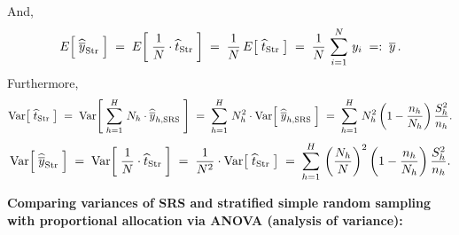 \documentclass{article}
\begin{document}
And,
\begin{equation*}
           E\!\left[\;\widehat{\overline{y}}_{\textnormal{Str}}\;\right]
   \;=\;  E\!\left[\;\dfrac{1}{N}\cdot\widehat{t}_{\textnormal{Str}}\;\right]
   \;=\;  \dfrac{1}{N}\,E\!\left[\;\widehat{t}_{\textnormal{Str}}\;\right]
   \;=\;  \dfrac{1}{N}\,\sum^{N}_{i=1}\,y_{i}
   \;=:\; \overline{y}\,.
\end{equation*}
Furthermore,
\begin{equation*}
             \textnormal{Var}\!\left[\;\widehat{t}_{\textnormal{Str}}\;\right]
    \;=\;  \textnormal{Var}\!\left[\; \sum^{H}_{h=1}\, N_{h}\cdot\widehat{\overline{y}}_{h,\textnormal{SRS}} \;\right]
    \;=\;  \sum^{H}_{h=1}\, N_{h}^{2}\cdot\textnormal{Var}\!\left[\; \widehat{\overline{y}}_{h,\textnormal{SRS}} \;\right]
    \;=\;  \sum^{H}_{h=1}\, N_{h}^{2}\left(1-\dfrac{n_{h}}{N_{h}}\right)\dfrac{S^{2}_{h}}{n_{h}}.
\end{equation*}
\begin{equation*}
             \textnormal{Var}\!\left[\;\widehat{\overline{y}}_{\textnormal{Str}}\;\right]
    \;=\;  \textnormal{Var}\!\left[\; \dfrac{1}{N}\cdot\widehat{t}_{\textnormal{Str}} \;\right]
    \;=\;  \dfrac{1}{N^{2}}\cdot\textnormal{Var}\!\left[\; \widehat{t}_{\textnormal{Str}} \;\right]
    \;=\;  \sum^{H}_{h=1}\, \left(\dfrac{N_{h}}{N}\right)^{2}\left(1-\dfrac{n_{h}}{N_{h}}\right)\dfrac{S^{2}_{h}}{n_{h}}.
\end{equation*}

\noindent
\textbf{Comparing variances of SRS and stratified simple random sampling with proportional allocation via ANOVA (analysis of variance):}
\end{document}
